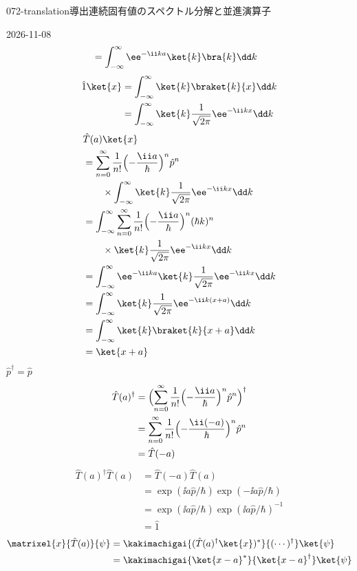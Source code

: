 \documentclass[uplatex,dvipdfmx,a4paper,11pt]{jsarticle}
\begin{document}
\begin{mondai}{072-translation}{導出}{連続固有値のスペクトル分解と並進演算子}
\begin{kotaeutsushi}{2026-11-08}
\begin{align*}
&=\int_{-\infty}^{\infty}\ee^{-\ii ka}\ket{k}\bra{k}\dd k
\end{align*}
\begin{align*}
\hat{1}\ket{x}&=\int_{-\infty}^{\infty}\ket{k}\braket{k}{x}\dd k\\
&=\int_{-\infty}^{\infty}\ket{k}\frac{1}{\sqrt{2\pi}}\ee^{-\ii kx}\dd k
\end{align*}
\begin{align*}
&\hat{T}(a)\ket{x}\\
&=\sum_{n=0}^{\infty}\frac{1}{n!}\Bigl(-\frac{\ii a}{\hbar}\Bigr)^{n}\hat{p}^{n}\\
&\qquad\times\int_{-\infty}^{\infty}\ket{k}\frac{1}{\sqrt{2\pi}}\ee^{-\ii kx}\dd k\\
&=\int_{-\infty}^{\infty}\sum_{n=0}^{\infty}\frac{1}{n!}\Bigl(-\frac{\ii a}{\hbar}\Bigr)^{n}(\hbar k)^{n}\\
&\qquad\times\ket{k}\frac{1}{\sqrt{2\pi}}\ee^{-\ii kx}\dd k\\
&=\int_{-\infty}^{\infty}\ee^{-\ii ka}\ket{k}\frac{1}{\sqrt{2\pi}}\ee^{-\ii kx}\dd k\\
&=\int_{-\infty}^{\infty}\ket{k}\frac{1}{\sqrt{2\pi}}\ee^{-\ii k(x+a)}\dd k\\
&=\int_{-\infty}^{\infty}\ket{k}\braket{k}{x+a}\dd k\\
&=\ket{x+a}
\end{align*}
$\hat{p}^{\dagger}=\hat{p}$
\begin{align*}
\hat{T}(a)^{\dagger}&=\Bigl(\sum_{n=0}^{\infty}\frac{1}{n!}\Bigl(-\frac{\ii a}{\hbar}\Bigr)^{n}\hat{p}^{n}\Bigr)^{\dagger}\\
&=\sum_{n=0}^{\infty}\frac{1}{n!}\Bigl(-\frac{\ii(-a)}{\hbar}\Bigr)^{n}\hat{p}^{n}\\
&=\hat{T}(-a)
\end{align*}
\begin{align*}
\hat{T}(a)^{\dagger}\hat{T}(a)&=\hat{T}(-a)\hat{T}(a)\\
&=\exp(\ii a\hat{p}/\hbar)\exp(-\ii a\hat{p}/\hbar)\\
&=\exp(\ii a\hat{p}/\hbar)\exp(\ii a\hat{p}/\hbar)^{-1}\\
&=\hat{1}
\end{align*}
\begin{align*}
\matrixel{x}{\hat{T}(a)}{\psi}&=\kakimachigai{(\hat{T}(a)^{\dagger}\ket{x})^{*}}{(\cdots)^{\dagger}}\ket{\psi}\\
&=\kakimachigai{\ket{x-a}^{*}}{\ket{x-a}^{\dagger}}\ket{\psi}\\

\end{align*}
\end{kotaeutsushi}
\end{mondai}
\end{document}
